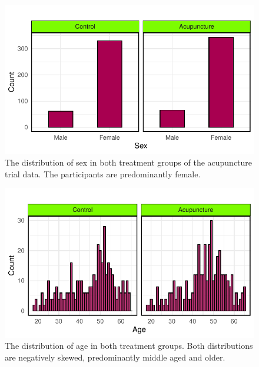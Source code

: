 \documentclass{article}
\newcommand{\pandocbounded}[1]{#1}
\begin{document}
\begin{figure}
\centering
\pandocbounded{\includegraphics[keepaspectratio]{Final_Report_files/figure-latex/unnamed-chunk-9-1.pdf}}
\caption{The distribution of sex in both treatment groups of the
acupuncture trial data. The participants are predominantly female.}
\end{figure}

\begin{figure}
\centering
\pandocbounded{\includegraphics[keepaspectratio]{Final_Report_files/figure-latex/unnamed-chunk-10-1.pdf}}
\caption{The distribution of age in both treatment groups. Both
distributions are negatively skewed, predominantly middle aged and
older.}
\end{figure}
\end{document}
